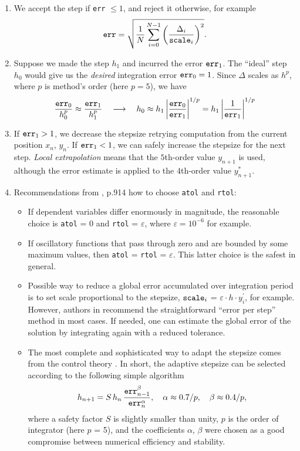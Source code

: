 \documentclass[]{article}
\begin{document}
\begin{enumerate}
\item We accept the step if \texttt{err} $\le 1$, and reject it otherwise, for example
$$
\mbox{\tt err} = \sqrt{\frac{1}{N}\sum_{i=0}^{N-1}
\left( \frac{\Delta_i}{\mbox{\tt scale}_i} \right)^2}.
$$
\item Suppose we made the step $h_1$ and incurred the error $\mbox{\tt err}_1$. The ``ideal'' step $h_0$ would give us the \textit{desired} integration error $\mbox{\tt err}_0 = 1$. Since $\Delta$ scales as $h^p$, where $p$ is method's order (here $p = 5$), we have
$$
\frac{\mbox{\tt err}_0}{h^p_0} \approx \frac{\mbox{\tt err}_1}{h^p_1}
\quad\longrightarrow\quad
h_0 \approx h_1 \left| \frac{\mbox{\tt err}_0}{\mbox{\tt err}_1} \right|^{1/p}
= h_1 \left| \frac{1}{\mbox{\tt err}_1} \right|^{1/p}
$$
\item If $\mbox{\tt err}_1 > 1$, we decrease the stepsize retrying computation from the current position $x_n$, $y_n$.  If $\mbox{\tt err}_1 < 1$, we can safely increase the stepsize for the next step. \textit{Local extrapolation} means that the $5$th-order value $y_{n+1}$ is used, although the error estimate is applied to the $4$th-order value $y^*_{n+1}$.
\item Recommendations from \cite{NR07}, p.914 how to choose {\tt atol} and {\tt rtol}:
\begin{itemize}
\item If dependent variables differ enormously in magnitude, the reasonable choice is {\tt atol} = 0 and {\tt rtol} = $\varepsilon$, where $\varepsilon = 10^{-6}$ for example.
\item If oscillatory functions that pass through zero and are bounded by some maximum values, then {\tt atol} = {\tt rtol} = $\varepsilon$. This latter choice is the safest in general.
\item Possible way to reduce a global error accumulated over integration period is to set scale proportional to the stepsize, $\mbox{\tt scale}_i$ = $\varepsilon \cdot h \cdot y^{\prime}_i$, for example. However, authors in \cite{NR07} recommend the straightforward ``error per step'' method in most cases. If needed, one can estimate the global error of the solution by integrating again with a reduced tolerance.
\item The most complete and sophisticated way to adapt the stepsize comes from the control theory \cite{Soderlind05, Hairer96, Gustafsson91}. In short, the adaptive stepsize can be selected according to the following simple algorithm
$$
h_{n+1} = S \, h_n \,
\frac{\mbox{\tt err}^{\beta}_{n-1}}{\mbox{\tt err}^{\alpha}_{n}},
\quad \alpha \approx 0.7/p, \quad \beta \approx 0.4/p,
$$
where a safety factor $S$ is slightly smaller than unity, $p$ is the order of integrator (here $p$ = 5), and the coefficients $\alpha$, $\beta$ were chosen as a good compromise between numerical efficiency and stability.
\end{itemize}

\end{enumerate}
\end{document}
